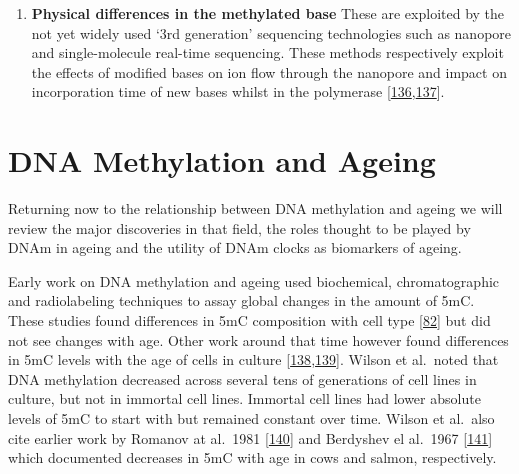 \documentclass[
]{book}
\providecommand{\tightlist}{%
  \setlength{\itemsep}{0pt}\setlength{\parskip}{0pt}}
\begin{document}
\begin{enumerate}
\def\labelenumi{\arabic{enumi}.}
\setcounter{enumi}{3}
\tightlist
\item
  \textbf{Physical differences in the methylated base}
  These are exploited by the not yet widely used `3rd generation' sequencing technologies such as nanopore and single-molecule real-time sequencing.
  These methods respectively exploit the effects of modified bases on ion flow through the nanopore and impact on incorporation time of new bases whilst in the polymerase {[}\protect\hyperlink{ref-Rhoads2015}{136},\protect\hyperlink{ref-Simpson2017}{137}{]}.
\end{enumerate}

\hypertarget{dna-methylation-and-ageing}{%
\section{DNA Methylation and Ageing}\label{dna-methylation-and-ageing}}

Returning now to the relationship between DNA methylation and ageing we will review the major discoveries in that field, the roles thought to be played by DNAm in ageing and the utility of DNAm clocks as biomarkers of ageing.

Early work on DNA methylation and ageing used biochemical, chromatographic and radiolabeling techniques to assay global changes in the amount of 5mC.
These studies found differences in 5mC composition with cell type {[}\protect\hyperlink{ref-Ehrlich1982}{82}{]} but did not see changes with age.
Other work around that time however found differences in 5mC levels with the age of cells in culture {[}\protect\hyperlink{ref-Wilson1983}{138},\protect\hyperlink{ref-Feinberg1983}{139}{]}.
Wilson et al.~noted that DNA methylation decreased across several tens of generations of cell lines in culture, but not in immortal cell lines.
Immortal cell lines had lower absolute levels of 5mC to start with but remained constant over time.
Wilson et al.~also cite earlier work by Romanov at al.~1981 {[}\protect\hyperlink{ref-Romanov1981}{140}{]} and Berdyshev el al.~1967 {[}\protect\hyperlink{ref-Berdyshev1967}{141}{]} which documented decreases in 5mC with age in cows and salmon, respectively.
\end{document}
